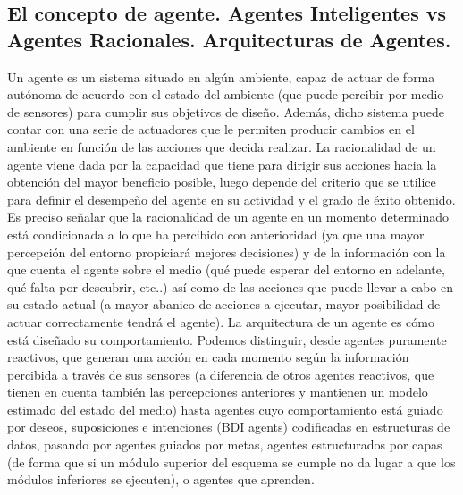 \documentclass[a4paper, 11pt]{article}
\begin{document}
\subsection{El concepto de agente. Agentes Inteligentes vs Agentes Racionales. Arquitecturas de Agentes.}
Un agente es un sistema situado en algún ambiente, capaz de actuar de forma autónoma de acuerdo con el estado del ambiente (que puede percibir por medio de sensores) para cumplir sus objetivos de diseño. Además, dicho sistema puede contar con una serie de actuadores que le permiten producir cambios en el ambiente en función de las acciones que decida realizar. La racionalidad de un agente viene dada por la capacidad que tiene para dirigir sus acciones hacia la obtención del mayor beneficio posible, luego depende del criterio que se utilice para definir el desempeño del agente en su actividad y el grado de éxito obtenido. Es preciso señalar que la racionalidad de un agente en un momento determinado está condicionada a lo que ha percibido con anterioridad (ya que una mayor percepción del entorno propiciará mejores decisiones) y de la información con la que cuenta el agente sobre el medio (qué puede esperar del entorno en adelante, qué falta por descubrir, etc..) así como de las acciones que puede llevar a cabo en su estado actual (a mayor abanico de acciones a ejecutar, mayor posibilidad de actuar correctamente tendrá el agente). La arquitectura de un agente es cómo está diseñado su comportamiento. Podemos distinguir, desde agentes puramente reactivos, que generan una acción en cada momento según la información percibida a través de sus sensores (a diferencia de otros agentes reactivos, que tienen en cuenta también las percepciones anteriores y mantienen un modelo estimado del estado del medio) hasta agentes cuyo comportamiento está guiado por deseos, suposiciones e intenciones (BDI agents) codificadas en estructuras de datos, pasando por agentes guiados por metas, agentes estructurados por capas (de forma que si un módulo superior del esquema se cumple no da lugar a que los módulos inferiores se ejecuten), o agentes que aprenden.
\end{document}
